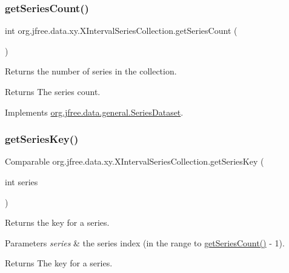 \subsubsection{\texorpdfstring{get\+Series\+Count()}{getSeriesCount()}}
{\footnotesize\ttfamily int org.\+jfree.\+data.\+xy.\+X\+Interval\+Series\+Collection.\+get\+Series\+Count (\begin{DoxyParamCaption}{ }\end{DoxyParamCaption})}

Returns the number of series in the collection.

\begin{DoxyReturn}{Returns}
The series count. 
\end{DoxyReturn}


Implements \mbox{\hyperlink{interfaceorg_1_1jfree_1_1data_1_1general_1_1_series_dataset_a84fe822f5918f941d9de1ed1b73c9f58}{org.\+jfree.\+data.\+general.\+Series\+Dataset}}.

\mbox{\label{classorg_1_1jfree_1_1data_1_1xy_1_1_x_interval_series_collection_abab4600997d3b0cb1e398f5ef12207ff}} 
\subsubsection{\texorpdfstring{get\+Series\+Key()}{getSeriesKey()}}
{\footnotesize\ttfamily Comparable org.\+jfree.\+data.\+xy.\+X\+Interval\+Series\+Collection.\+get\+Series\+Key (\begin{DoxyParamCaption}\item[{int}]{series }\end{DoxyParamCaption})}

Returns the key for a series.


\begin{DoxyParams}{Parameters}
{\em series} & the series index (in the range {} to {\ttfamily \mbox{\hyperlink{classorg_1_1jfree_1_1data_1_1xy_1_1_x_interval_series_collection_ad9ed84e38a8cce0df6501925618efdf7}{get\+Series\+Count()}} -\/ 1}).\\
\hline
\end{DoxyParams}
\begin{DoxyReturn}{Returns}
The key for a series.
\end{DoxyReturn}

